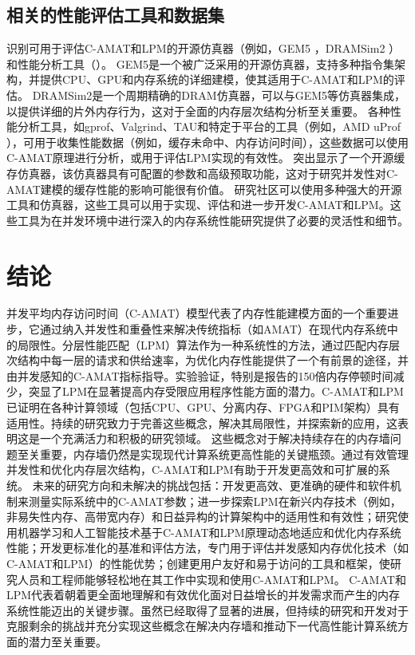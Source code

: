 \documentclass[UTF8]{ctexart}
\begin{document}
\subsection{相关的性能评估工具和数据集}
识别可用于评估C-AMAT和LPM的开源仿真器（例如，GEM5 \cite{sunMemoryPdf}，DRAMSim2 \cite{sunMemoryPdf}）和性能分析工具（\cite{gitbookToolsUtils}）。
GEM5是一个被广泛采用的开源仿真器，支持多种指令集架构，并提供CPU、GPU和内存系统的详细建模，使其适用于C-AMAT和LPM的评估\cite{hermes2024arxiv}。
DRAMSim2是一个周期精确的DRAM仿真器，可以与GEM5等仿真器集成，以提供详细的片外内存行为，这对于全面的内存层次结构分析至关重要\cite{sunMemoryPdf}。
各种性能分析工具，如gprof、Valgrind、TAU\cite{perfToolsWiki, perfToolsFiveable}和特定于平台的工具（例如，AMD uProf \cite{gitbookToolsUtils}），可用于收集性能数据（例如，缓存未命中、内存访问时间），这些数据可以使用C-AMAT原理进行分析，或用于评估LPM实现的有效性。
\cite{githubCacheSim}突出显示了一个开源缓存仿真器，该仿真器具有可配置的参数和高级预取功能，这对于研究并发性对C-AMAT建模的缓存性能的影响可能很有价值。
研究社区可以使用多种强大的开源工具和仿真器，这些工具可以用于实现、评估和进一步开发C-AMAT和LPM。这些工具为在并发环境中进行深入的内存系统性能研究提供了必要的灵活性和细节。

\section{结论}
并发平均内存访问时间（C-AMAT）模型代表了内存性能建模方面的一个重要进步，它通过纳入并发性和重叠性来解决传统指标（如AMAT）在现代内存系统中的局限性。分层性能匹配（LPM）算法作为一种系统性的方法，通过匹配内存层次结构中每一层的请求和供给速率，为优化内存性能提供了一个有前景的途径，并由并发感知的C-AMAT指标指导。实验验证，特别是报告的150倍内存停顿时间减少，突显了LPM在显著提高内存受限应用程序性能方面的潜力。C-AMAT和LPM已证明在各种计算领域（包括CPU、GPU、分离内存、FPGA和PIM架构）具有适用性。持续的研究致力于完善这些概念，解决其局限性，并探索新的应用，这表明这是一个充满活力和积极的研究领域。
这些概念对于解决持续存在的内存墙问题至关重要，内存墙仍然是实现现代计算系统更高性能的关键瓶颈。通过有效管理并发性和优化内存层次结构，C-AMAT和LPM有助于开发更高效和可扩展的系统。
未来的研究方向和未解决的挑战包括：开发更高效、更准确的硬件和软件机制来测量实际系统中的C-AMAT参数；进一步探索LPM在新兴内存技术（例如，非易失性内存、高带宽内存）和日益异构的计算架构中的适用性和有效性；研究使用机器学习和人工智能技术基于C-AMAT和LPM原理动态地适应和优化内存系统性能；开发更标准化的基准和评估方法，专门用于评估并发感知内存优化技术（如C-AMAT和LPM）的性能优势；创建更用户友好和易于访问的工具和框架，使研究人员和工程师能够轻松地在其工作中实现和使用C-AMAT和LPM。
C-AMAT和LPM代表着朝着更全面地理解和有效优化面对日益增长的并发需求而产生的内存系统性能迈出的关键步骤。虽然已经取得了显著的进展，但持续的研究和开发对于克服剩余的挑战并充分实现这些概念在解决内存墙和推动下一代高性能计算系统方面的潜力至关重要。

\printbibliography %
\end{document}
